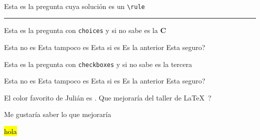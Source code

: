 \documentclass[12pt, addpoints, answers]{exam}
\begin{document}
\begin{center}
\end{center}
\vspace{0.1in}
\begin{minipage}{0.5\linewidth}
\\
\vspace{0.2in}
\end{minipage}
\begin{minipage}{0.5\linewidth}
\end{minipage}

\gradetable[v][questions]
\begin{questions}
\question[10] Esta es la pregunta cuya solución es un \verb!\rule!
\begin{solution}
\textcolor{red}{\rule{5cm}{5cm}}
\end{solution}
\question[20] Esta es la pregunta con \verb!choices! y si no sabe es la \textbf{C}
\begin{choices}
\choice Esta no es
\choice Esta tampoco es
\CorrectChoice Esta si es
\choice Es la anterior
\choice \textquestiondown Esta seguro?
\end{choices}
\question[30] Esta es la pregunta con \verb!checkboxes! y si no sabe es la tercera
\begin{checkboxes}
\choice Esta no es
\choice Esta tampoco es
\CorrectChoice Esta si es
\choice Es la anterior
\choice \textquestiondown Esta seguro?
\end{checkboxes}
\question[40] El color favorito de Julián es \fillin[Morado].
\bonusquestion[5] \textquestiondown Que mejoraría del taller de \LaTeX\ ?
\begin{solution}
Me gustaría saber lo que mejoraría
\end{solution} 
{ \hl{hola}} 
\end{questions}
\end{document}
